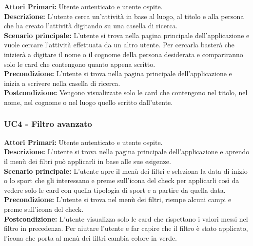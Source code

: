 \textbf{Attori Primari:} Utente autenticato e utente ospite.\\
\textbf{Descrizione:} L'utente cerca un'attività in base al luogo, al titolo e alla persona che ha creato l'attività digitando su una casella di ricerca.\\
\textbf{Scenario principale:} L'utente si trova nella pagina principale dell'applicazione e vuole cercare l'attività effettuata da un altro utente. Per cercarla basterà che inizierà a digitare il nome o il cognome della persona desiderata e compariranno solo le card che contengono quanto appena scritto.\\
\textbf{Precondizione:} L'utente si trova nella pagina principale dell'applicazione e inizia a scrivere nella casella di ricerca.\\
\textbf{Postcondizione:} Vengono visualizzate solo le card che contengono nel titolo, nel nome, nel cognome o nel luogo quello scritto dall'utente.\\

\subsubsection{ UC4 - Filtro avanzato}

\textbf{Attori Primari:} Utente autenticato e utente ospite.\\
\textbf{Descrizione:} L'utente si trova nella pagina principale dell'applicazione e aprendo il menù dei filtri può applicarli in base alle sue esigenze.\\
\textbf{Scenario principale:} L'utente apre il menù dei filtri e seleziona la data di inizio o lo sport che gli interessano e preme sull'icona del check per applicarli così da vedere solo le card con quella tipologia di sport e a partire da quella data.\\
\textbf{Precondizione:} L'utente si trova nel menù dei filtri, riempe alcuni campi e preme sull'icona del check.\\
\textbf{Postcondizione:} L'utente visualizza solo le card che rispettano i valori messi nel filtro in precedenza. Per aiutare l'utente e far capire che il filtro è stato applicato, l'icona che porta al menù dei filtri cambia colore in verde.\\

\newpage

